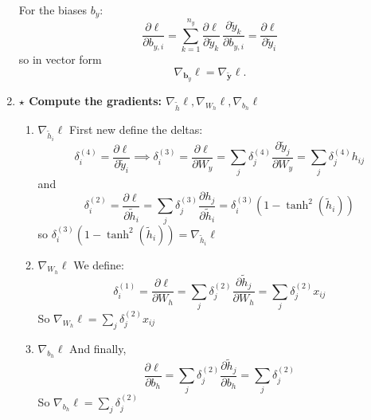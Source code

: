 \documentclass[12pt,a4paper]{article}
\begin{document}
\begin{enumerate}[resume]
    For the biases $b_y$:
    \[
    \frac{\partial \ell}{\partial b_{y,i}}
    = \sum_{k=1}^{n_y} \frac{\partial \ell}{\partial \tilde{y}_k}\,\frac{\partial \tilde{y}_k}{\partial b_{y,i}}
    = \frac{\partial \ell}{\partial \tilde{y}_i}
    \]
    so in vector form
    \[
    \nabla_{\mathbf{b}_y}\ell = \nabla_{\tilde{\mathbf{y}}}\ell .
    \]

    \item \textbf{$\star$ Compute the gradients: $\nabla_{\tilde{h}}\ell, \nabla_{W_h}\ell, \nabla_{b_h}\ell$}

    \begin{enumerate}
        \item $ \nabla_{\tilde{h}_i}\ell $ \newline
        First new define the deltas: 
        \[
        \delta_i^{(4)} = \frac{\partial \ell}{\partial \tilde{y}_i} \implies \delta_i^{(3)} = 
        \frac{\partial \ell}{\partial W_y} = \sum_j \delta_j^{(4)} \frac{\partial \tilde{y}_j}{\partial W_y} =
        \sum_j \delta_j^{(4)} h_{ij} 
        \]
        and
        \[
        \delta_i^{(2)} = \frac{\partial \ell}{\partial \tilde{h}_i} = \sum_j \delta_j^{(3)} \frac{\partial h_j}{\partial \tilde{h}_i} =
        \delta_i^{(3)} (1 - \tanh^2(\tilde{h}_i))
        \]
        so $\delta_i^{(3)} (1 - \tanh^2(\tilde{h}_i)) = \nabla_{\tilde{h}_i}\ell $
        
        \item $\nabla_{W_h}\ell$ \newline 
        We define:
        \[
        \delta_i^{(1)} = \frac{\partial \ell}{\partial W_h} = \sum_j \delta_j^{(2)} \frac{\partial \tilde{h}_j}{\partial W_h} =
        \sum_j \delta_j^{(2)} x_{ij}
        \]
        So $\nabla_{W_h}\ell = \sum_j \delta_j^{(2)} x_{ij}$
        
        \item $\nabla_{b_h}\ell$ \newline
        And finally,
        \[
        \frac{\partial \ell}{\partial b_h} = \sum_j \delta_j^{(2)} \frac{\partial \tilde{h}_j}{\partial b_h} = 
        \sum_j \delta_j^{(2)}
        \]
        So $\nabla_{b_h}\ell = \sum_j \delta_j^{(2)} $
        
    \end{enumerate}

\end{enumerate}
\end{document}
